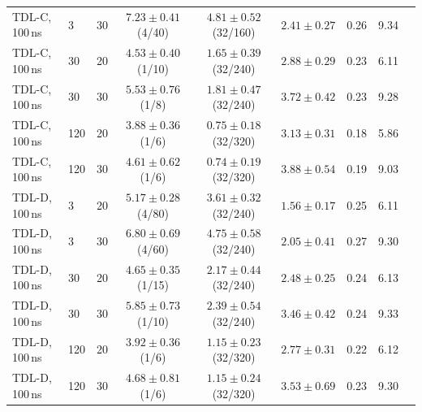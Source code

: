\begin{table}[!htbp]
{\begin{tabular}{llccccccc}
TDL-C, 100\,ns & 3 & 30 & $7.23\pm0.41$ (4/40) & $4.81\pm0.52$ (32/160) & $2.41\pm0.27$ & 0.26 & 9.34\\
TDL-C, 100\,ns & 30 & 20 & $4.53\pm0.40$ (1/10) & $1.65\pm0.39$ (32/240) & $2.88\pm0.29$ & 0.23 & 6.11\\
TDL-C, 100\,ns & 30 & 30 & $5.53\pm0.76$ (1/8) & $1.81\pm0.47$ (32/240) & $3.72\pm0.42$ & 0.23 & 9.28\\
TDL-C, 100\,ns & 120 & 20 & $3.88\pm0.36$ (1/6) & $0.75\pm0.18$ (32/320) & $3.13\pm0.31$ & 0.18 & 5.86\\
TDL-C, 100\,ns & 120 & 30 & $4.61\pm0.62$ (1/6) & $0.74\pm0.19$ (32/320) & $3.88\pm0.54$ & 0.19 & 9.03\\
\midrule
TDL-D, 100\,ns & 3 & 20 & $5.17\pm0.28$ (4/80) & $3.61\pm0.32$ (32/240) & $1.56\pm0.17$ & 0.25 & 6.11\\
TDL-D, 100\,ns & 3 & 30 & $6.80\pm0.69$ (4/60) & $4.75\pm0.58$ (32/240) & $2.05\pm0.41$ & 0.27 & 9.30\\
TDL-D, 100\,ns & 30 & 20 & $4.65\pm0.35$ (1/15) & $2.17\pm0.44$ (32/240) & $2.48\pm0.25$ & 0.24 & 6.13\\
TDL-D, 100\,ns & 30 & 30 & $5.85\pm0.73$ (1/10) & $2.39\pm0.54$ (32/240) & $3.46\pm0.42$ & 0.24 & 9.33\\
TDL-D, 100\,ns & 120 & 20 & $3.92\pm0.36$ (1/6) & $1.15\pm0.23$ (32/320) & $2.77\pm0.31$ & 0.22 & 6.12\\
TDL-D, 100\,ns & 120 & 30 & $4.68\pm0.81$ (1/6) & $1.15\pm0.24$ (32/320) & $3.53\pm0.69$ & 0.23 & 9.30\\
\bottomrule
\end{tabular}}
\end{table}
